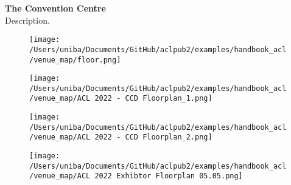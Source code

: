 \normalsize
\vspace*{-8mm}
 {\Large \textbf{The Convention Centre}}\\\leavevmode\newline
Description.

\begin{figure}[h!]
  \centering
      \texttt{[image: /Users/uniba/Documents/GitHub/aclpub2/examples/handbook\_acl/venue\_map/floor.png]}
 \end{figure}
  \begin{figure}[h!]
  \centering
      \texttt{[image: /Users/uniba/Documents/GitHub/aclpub2/examples/handbook\_acl/venue\_map/ACL 2022 - CCD Floorplan\_1.png]}
 \end{figure}
  \begin{figure}[h!]
  \centering
      \texttt{[image: /Users/uniba/Documents/GitHub/aclpub2/examples/handbook\_acl/venue\_map/ACL 2022 - CCD Floorplan\_2.png]}
 \end{figure}

  \begin{figure}[h!]
  \centering
      \texttt{[image: /Users/uniba/Documents/GitHub/aclpub2/examples/handbook\_acl/venue\_map/ACL 2022 Exhibtor Floorplan 05.05.png]}
 \end{figure}
\clearpage